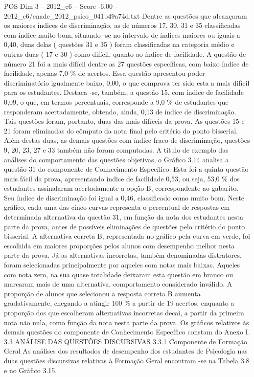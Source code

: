 \begin{textsample}{POS Dim 3 – 2012\_c6 – Score -6.00 – 2012\_c6/enade\_2012\_psico\_041b49a74d.txt}
Dentre as questões que alcançaram os maiores índices de discriminação, as de números 17, 30, 31 e 35 classificadas com índice muito bom, situando -se no intervalo de índices maiores ou iguais a 0,40, duas delas ( questões 31 e 35 ) foram classificadas na categoria médio e outras duas ( 17 e 30 ) como difícil, quanto ao índice de facilidade.
A questão de número 21 foi a mais difícil dentre as 27 questões específicas, com baixo índice de facilidade, apenas 7,0 \% de acertos.
Essa questão apresentou poder discriminatório igualmente baixo, 0,00, o que comprova ter sido esta a mais difícil para os estudantes.
Destaca -se, também, a questão 15, com índice de facilidade 0,09, o que, em termos percentuais, corresponde a 9,0 \% de estudantes que responderam acertadamente, obtendo, ainda, 0,13 de índice de discriminação.
Tais questões foram, portanto, duas das mais difíceis da prova.
As questões 15 e 21 foram eliminadas do cômputo da nota final pelo critério do ponto bisserial.
Além destas duas, as demais questões com índice fraco de discriminação, questões 9, 20, 23, 27 e 33 também não foram computadas.
A título de exemplo das análises do comportamento das questões objetivas, o Gráfico 3.14 analisa a questão 31 do componente de Conhecimento Específico.
Esta foi a quinta questão mais fácil da prova, apresentando índice de facilidade 0,53, ou seja, 53,0 \% dos estudantes assinalaram acertadamente a opção B, correspondente ao gabarito.
Seu índice de discriminação foi igual a 0,46, classificado como muito bom.
Neste gráfico, cada uma das cinco curvas representa o percentual de respostas em determinada alternativa da questão 31, em função da nota dos estudantes nesta parte da prova, antes de possíveis eliminações de questões pelo critério do ponto bisserial.
A alternativa correta B, representada no gráfico pela curva em verde, foi escolhida em maiores proporções pelos alunos com desempenho melhor nesta parte da prova.
Já as alternativas incorretas, também denominadas distratores, foram selecionadas principalmente por aqueles com notas mais baixas.
Aqueles com nota zero, na sua quase totalidade deixaram esta questão em branco ou marcaram mais de uma alternativa, comportamento considerado inválido.
A proporção de alunos que selecionou a resposta correta B aumenta gradativamente, chegando a atingir 100 \% a partir de 19 acertos, enquanto a proporção dos que escolheram alternativas incorretas decai, a partir da primeira nota não nula, como função da nota nesta parte da prova.
Os gráficos relativos às demais questões do componente de Conhecimento Específico constam do Anexo I. 3.3 ANÁLISE DAS QUESTÕES DISCURSIVAS 3.3.1 Componente de Formação Geral As análises dos resultados de desempenho dos estudantes de Psicologia nas duas questões discursivas relativas à Formação Geral encontram -se na Tabela 3.8 e no Gráfico 3.15.

\end{textsample}
